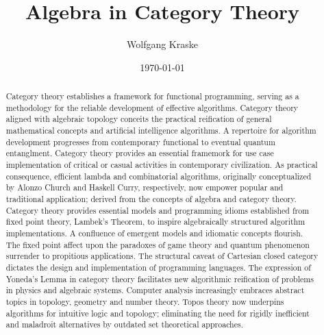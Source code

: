 \documentclass[aps,twocolumn,secnumarabic,nobalancelastpage,amsmath,amssymb,
amsthm,nofootinbib,parskip=full]{revtex4}
\numberwithin{equation}{section}
\begin{document}
\title{Algebra in Category Theory}
\author         {Wolfgang Kraske}
\date{\today}

\begin{abstract}
  Category theory establishes a framework for functional programming,
  serving as a methodology for the reliable development of effective algorithms.
  Category theory aligned with algebraic topology conceits the practical
  reification of general mathematical concepts and artificial intelligence
  algorithms. A repertoire for algorithm development progresses from
  contemporary functional to eventual quantum entanglment.
  Category theory provides an essential framemork for use case implementation
  of critical or casual activities in contemporary civilization.
  As practical consequence, efficient lambda and combinatorial algorithms,
  originally conceptualized by Alonzo Church and Haskell Curry, respectively,
  now empower popular and traditional application;
  derived from the concepts of algebra and category theory.
  Category theory provides essential models and 
  programming idioms established from fixed point theory, Lambek's Theorem,
  to inspire algebraically structured algorithm implementations.
  A confluence of emergent models and idiomatic concepts flourish.
  The fixed point affect upon the paradoxes of game theory and
  quantum phenomenon surrender to propitious applications. 
  The structural caveat of Cartesian closed category 
  dictates the design and implementation of programming languages.
  The expression of Yoneda's Lemma in category theory
  facilitates new algorithmic
  reification of problems in physics and algebraic systems.
  Computer analysis increasingly embraces abstract topics in topology,
  geometry and number theory.
  Topos theory now underpins algorithms for intuitive logic and topology;
  eliminating the need for rigidly inefficient and maladroit
  alternatives by outdated set theoretical approaches.
\end{abstract}

\maketitle

\setlength{\parindent}{0em}
\setlength{\parskip}{0.5em}
\renewcommand{\baselinestretch}{1.0}
\end{document}
